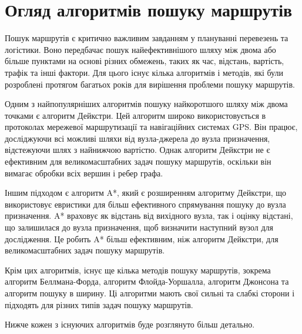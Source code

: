\section{Огляд алгоритмів пошуку маршрутів}
\label{sec:route-search-algorithms}

Пошук маршрутів є критично важливим завданням у плануванні перевезень та логістики. Воно передбачає пошук найефективнішого шляху між двома або більше пунктами на основі різних обмежень, таких як час, відстань, вартість, трафік та інші фактори. Для цього існує кілька алгоритмів і методів, які були розроблені протягом багатьох років для вирішення проблеми пошуку маршрутів.

Одним з найпопулярніших алгоритмів пошуку найкоротшого шляху між двома точками є алгоритм Дейкстри. Цей алгоритм широко використовується в протоколах мережевої маршрутизації та навігаційних системах GPS. Він працює, досліджуючи всі можливі шляхи від вузла-джерела до вузла призначення, відстежуючи шлях з найнижчою вартістю. Однак алгоритм Дейкстри не є ефективним для великомасштабних задач пошуку маршрутів, оскільки він вимагає обробки всіх вершин і ребер графа.

Іншим підходом є алгоритм A*, який є розширенням алгоритму Дейкстри, що використовує евристики для більш ефективного спрямування пошуку до вузла призначення. A* враховує як відстань від вихідного вузла, так і оцінку відстані, що залишилася до вузла призначення, щоб визначити наступний вузол для дослідження. Це робить A* більш ефективним, ніж алгоритм Дейкстри, для великомасштабних задач пошуку маршрутів.

Крім цих алгоритмів, існує ще кілька методів пошуку маршрутів, зокрема алгоритм Беллмана-Форда, алгоритм Флойда-Уоршалла, алгоритм Джонсона та алгоритм пошуку в ширину. Ці алгоритми мають свої сильні та слабкі сторони і підходять для різних типів задач пошуку маршрутів.

Нижче кожен з існуючих алгоритмів буде розглянуто більш детально.












